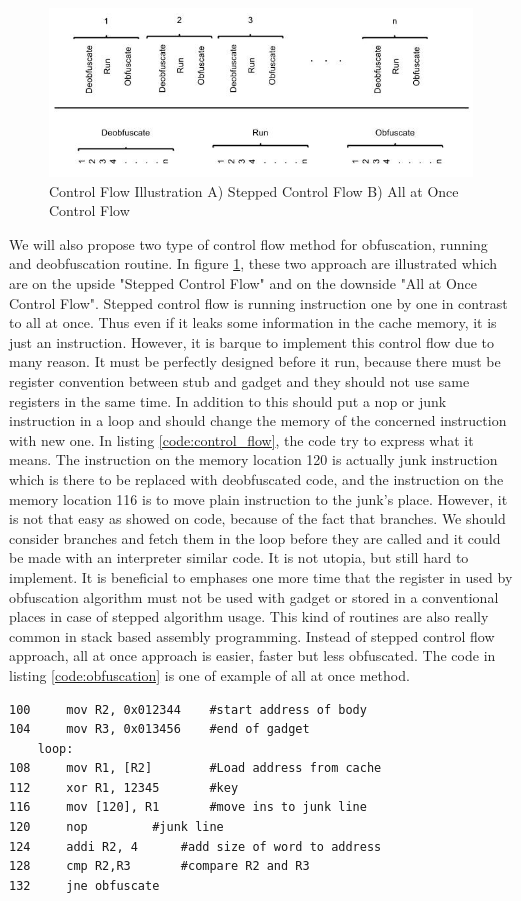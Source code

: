 		    \begin{figure}[h!]
	        \centering
	        \includegraphics[width=1\textwidth]{img/control_flow.jpg}
	        \caption{Control Flow Illustration A) Stepped Control Flow B) All at Once Control Flow}
	        \label{fig:controlflow}
	    \end{figure}
	        We will also propose two type of control flow method for obfuscation, running and deobfuscation routine. In figure \ref{fig:controlflow}, these two approach are illustrated which are on the upside "Stepped Control Flow" and on the downside "All at Once Control Flow". Stepped control flow is running instruction one by one in contrast to all at once. Thus even if it leaks some information in the cache memory, it is just an instruction. However, it is barque to implement this control flow due to many reason. It must be perfectly designed before it run, because there must be register convention between stub and gadget and they should not use same registers in the same time. In addition to this should put a nop or junk instruction in a loop and should change the memory of the concerned instruction with new one. In listing \ref{code:control_flow}, the code try to express what it means. The instruction on the memory location 120 is actually junk instruction which is there to be replaced with deobfuscated code, and the instruction on the memory location 116 is to move plain instruction to the junk's place. However, it is not that easy as showed on code, because of the fact that branches. We should consider branches and fetch them in the loop before they are called and it could be made with an interpreter similar code. It is not utopia, but still hard to implement. It is beneficial to emphases one more time that the register in used by obfuscation algorithm must not be used with gadget or stored in a conventional places in case of stepped algorithm usage. This kind of routines are also really common in stack based assembly programming. Instead of stepped control flow approach, all at once approach is easier, faster but less obfuscated. The code in listing \ref{code:obfuscation} is one of example of all at once method. 
	    \begin{lstlisting}[caption=The code example of stepped control flow approach, label=code:control_flow]
100		mov R2, 0x012344 	#start address of body
104		mov R3, 0x013456 	#end of gadget
	loop: 
108		mov R1, [R2] 		#Load address from cache
112		xor R1, 12345 		#key
116		mov [120], R1 		#move ins to junk line
120		nop			#junk line
124		addi R2, 4 		#add size of word to address
128		cmp R2,R3 		#compare R2 and R3
132		jne obfuscate
		\end{lstlisting}


